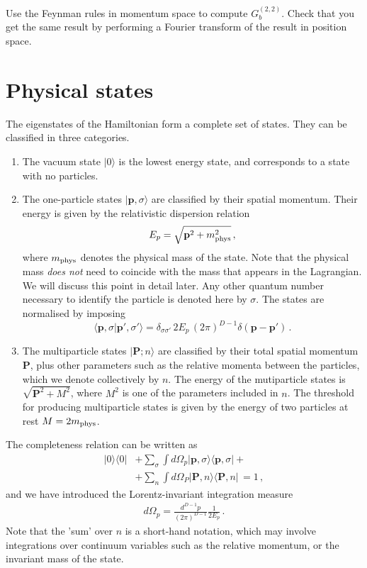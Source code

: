 \begin{Ex}
  Use the Feynman rules in momentum space to compute
  $G^{(2,2)}_b$. Check that you get the same result by performing a
  Fourier transform of the result in position space.
\end{Ex}

\section{Physical states}
\label{sec:physical-states}

The eigenstates of the Hamiltonian form a complete set of states. They
can be classified in three categories.
\begin{enumerate}
\item The vacuum state $|0\rangle$ is the lowest energy state, and
  corresponds to a state with no particles.
\item The one-particle states $|\mathbf{p},\sigma\rangle$ are
  classified by their spatial momentum. Their energy is given by the
  relativistic dispersion relation 
  \begin{equation}
    \label{eq:RelDispRel}
    E_p = \sqrt{\mathbf{p}^2 + m_\mathrm{phys}^2}\, ,
  \end{equation}
  where $m_\mathrm{phys}$ denotes the physical mass of the state. Note that the
  physical mass {\em does not} need to coincide with the mass that
  appears in the Lagrangian. We will discuss this point in detail
  later. Any other quantum number necessary to identify the particle
  is denoted here by $\sigma$.  The states are normalised by imposing
\begin{equation}
  \label{eq:OnePartNorm}
  \langle \mathbf{p}, \sigma | \mathbf{p}', \sigma' \rangle =
  \delta_{\sigma\sigma'}\, 
  2 E_p\, (2\pi)^{D-1} \delta(\mathbf{p}-\mathbf{p}')\, .
\end{equation}
\item The multiparticle states $|\mathbf{P};n\rangle$ are classified
  by their total spatial momentum $\mathbf{P}$, plus other parameters
  such as the relative momenta between the particles, which we denote
  collectively by $n$. The energy of the mutiparticle states is
  $\sqrt{\mathbf{P}^2+M^2}$, where $M^2$ is one of the parameters
  included in $n$. The threshold for producing multiparticle states is
  given by the energy of two particles at rest $M=2m_\mathrm{phys}$.
\end{enumerate}
The completeness relation can be written as
\begin{align}
  |0\rangle \langle 0| 
  &+ \sum_\sigma \int d\Omega_p 
    |\mathbf{p},\sigma\rangle \langle \mathbf{p},\sigma| + \nonumber
  \\
  &+ \sum_n \int d\Omega_P 
    |\mathbf{P},n\rangle \langle \mathbf{P},n|\, = 1\, ,
\end{align}
and we have introduced the Lorentz-invariant integration measure
\begin{align}
  d\Omega_p = \frac{d^{D-1}p}{(2\pi)^{D-1}}
    \frac{1}{2E_p} \, .
\end{align}
Note that the 'sum' over $n$ is a short-hand notation, which may
involve integrations over continuum variables such as the relative
momentum, or the invariant mass of the state. 

